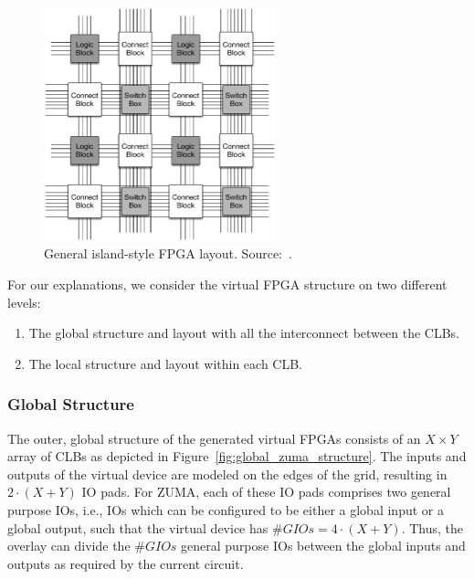 \documentclass{article}
\begin{document}
\begin{figure}[htp]
    \centering
    \includegraphics[width=0.6\textwidth]{Figures/island_style}%
    \caption{General island-style FPGA layout. Source:~\cite{ComptonH2002Reconfigurablecomputingsurvey}.}
    \label{fig:island-style_fpga}
\end{figure}

For our explanations, we consider the virtual FPGA structure on two different levels:
\begin{enumerate}
    \item The global structure and layout with all the interconnect between the CLBs.
    \item The local structure and layout within each CLB.
\end{enumerate}

\subsubsection{Global Structure}
The outer, global structure of the generated virtual FPGAs consists of an \(X \times Y\) array of CLBs as depicted in Figure~\ref{fig:global_zuma_structure}.
The inputs and outputs of the virtual device are modeled on the edges of the grid, resulting in \({2 \cdot (X + Y)}\) IO pads.
For ZUMA, each of these IO pads comprises two general purpose IOs, i.e., IOs which can be configured to be either a global input or a global output, such that the virtual device has \({\#GIOs = 4 \cdot (X + Y)}\).
Thus, the overlay can divide the \(\#GIOs\) general purpose IOs between the global inputs and outputs as required by the current circuit.
\end{document}
